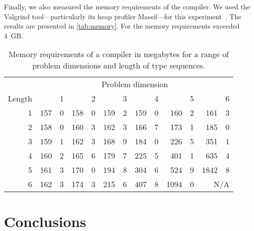 \documentclass[10pt,a4paper]{article}
\theoremstyle{definition}\newtheorem{problem}{Problem}
\begin{document}
Finally, we also measured the memory requirements of the compiler. We used the Valgrind tool---particularly its heap profiler Massif---for this experiment~\cite{RefWorks:127}. The results are presented in \autoref{tab:memory}. For  the memory requirements exceeded 4~GB.
\renewcommand{\arraystretch}{1.00}
\renewcommand{\tabcolsep}{3mm}
\begin{table}[t]
\caption{Memory requirements of a compiler in megabytes for a range of problem dimensions and length of type sequences.} \begin{center}
\begin{tabular}{r*{6}{r@{.}l}}
\toprule
 & \multicolumn{12}{c}{Problem dimension } \\ \cmidrule(l){2-13}
Length  & \multicolumn{2}{r}{1} & \multicolumn{2}{r}{2} & \multicolumn{2}{r}{3} & \multicolumn{2}{r}{4} & \multicolumn{2}{r}{5} & \multicolumn{2}{r}{6} \\ \cmidrule(r){1-1} \cmidrule(l){2-13}
1 & 157 & 0 & 158 & 0 & 159 & 2 & 159 & 0 &  160 & 2 &  161 & 3 \\
2 & 158 & 0 & 160 & 3 & 162 & 3 & 166 & 7 &  173 & 1 &  185 & 0 \\
3 & 159 & 1 & 162 & 3 & 168 & 9 & 184 & 0 &  226 & 5 &  351 & 1 \\
4 & 160 & 2 & 165 & 6 & 179 & 7 & 225 & 5 &  401 & 1 &  635 & 4 \\
5 & 161 & 3 & 170 & 0 & 194 & 8 & 304 & 6 &  524 & 9 & 1842 & 8 \\
6 & 162 & 3 & 174 & 3 & 215 & 6 & 407 & 8 & 1094 & 0 & \multicolumn{2}{r}{N/A} \\
\bottomrule
\end{tabular}
\end{center}
\label{tab:memory}
\end{table}

\section{Conclusions}
\label{sec:concl}
\end{document}
